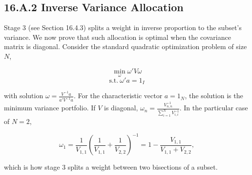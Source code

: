 \subsection*{16.A.2 Inverse Variance Allocation}

Stage 3 (see Section 16.4.3) splits a weight in inverse proportion to the subset’s variance. We now prove that such allocation is optimal when the covariance matrix is diagonal. Consider the standard quadratic optimization problem of size $N$,

\[
\min_{\omega} \omega' V \omega
\]
\[
\text{s.t.} \ \omega' a = 1_I
\]

with solution $\omega = \frac{V^{-1} a}{a' V^{-1} a}$. For the characteristic vector $a = 1_N$, the solution is the minimum variance portfolio. If $V$ is diagonal, $\omega_n = \frac{V^{-1}_{n,n}}{\sum_{i=1}^{N} V^{-1}_{i,i}}$. In the particular case of $N = 2$, 

\[
\omega_1 = \frac{1}{V_{1,1}} \left( \frac{1}{V_{1,1}} + \frac{1}{V_{2,2}} \right)^{-1} = 1 - \frac{V_{1,1}}{V_{1,1} + V_{2,2}},
\]

which is how stage 3 splits a weight between two bisections of a subset.
